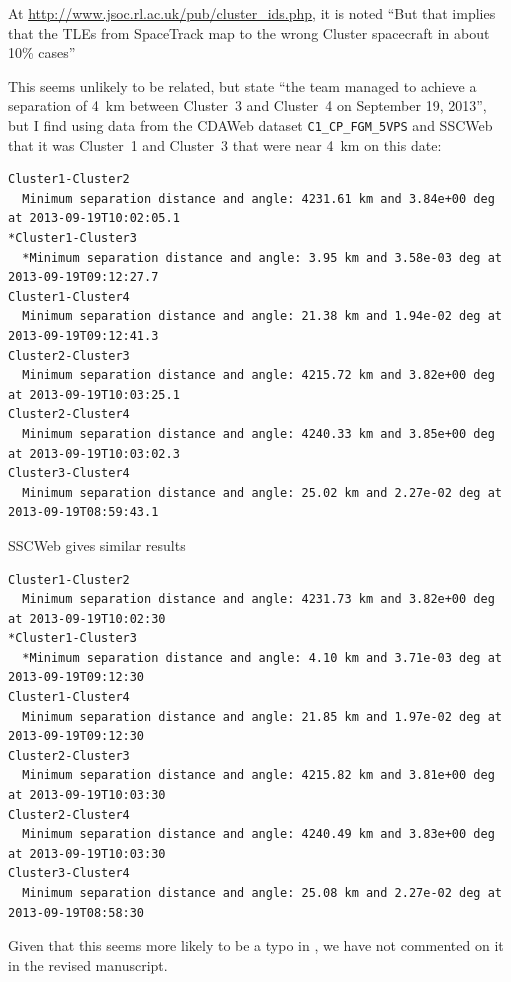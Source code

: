 \documentclass[11pt]{article}
\let\oldhref\href
\renewcommand{\href}[2]{\oldhref{#1}{\uline{#2}}}
\begin{document}
{\color{violet}
\begin{leftbar}
At \href{cluster\_ids.php}{http://www.jsoc.rl.ac.uk/pub/cluster\_ids.php}, it is noted ``But that implies that the TLEs from SpaceTrack map to the wrong Cluster spacecraft in about 10\% cases''

This seems unlikely to be related, but \citep{Escoubet2021} state ``the team managed to achieve a separation of 4~km between Cluster~3 and Cluster~4 on September 19, 2013'', but I find using data from the CDAWeb dataset \texttt{C1\_CP\_FGM\_5VPS} and SSCWeb that it was Cluster~1 and Cluster~3 that were near 4~km on this date:

\begin{small}
\begin{verbatim}
Cluster1-Cluster2
  Minimum separation distance and angle: 4231.61 km and 3.84e+00 deg at 2013-09-19T10:02:05.1
*Cluster1-Cluster3
  *Minimum separation distance and angle: 3.95 km and 3.58e-03 deg at 2013-09-19T09:12:27.7
Cluster1-Cluster4
  Minimum separation distance and angle: 21.38 km and 1.94e-02 deg at 2013-09-19T09:12:41.3
Cluster2-Cluster3
  Minimum separation distance and angle: 4215.72 km and 3.82e+00 deg at 2013-09-19T10:03:25.1
Cluster2-Cluster4
  Minimum separation distance and angle: 4240.33 km and 3.85e+00 deg at 2013-09-19T10:03:02.3
Cluster3-Cluster4
  Minimum separation distance and angle: 25.02 km and 2.27e-02 deg at 2013-09-19T08:59:43.1
\end{verbatim}
\end{small}

SSCWeb gives similar results

\begin{small}
\begin{verbatim}
Cluster1-Cluster2
  Minimum separation distance and angle: 4231.73 km and 3.82e+00 deg at 2013-09-19T10:02:30
*Cluster1-Cluster3
  *Minimum separation distance and angle: 4.10 km and 3.71e-03 deg at 2013-09-19T09:12:30
Cluster1-Cluster4
  Minimum separation distance and angle: 21.85 km and 1.97e-02 deg at 2013-09-19T09:12:30
Cluster2-Cluster3
  Minimum separation distance and angle: 4215.82 km and 3.81e+00 deg at 2013-09-19T10:03:30
Cluster2-Cluster4
  Minimum separation distance and angle: 4240.49 km and 3.83e+00 deg at 2013-09-19T10:03:30
Cluster3-Cluster4
  Minimum separation distance and angle: 25.08 km and 2.27e-02 deg at 2013-09-19T08:58:30    
\end{verbatim}
\end{small}

Given that this seems more likely to be a typo in \cite{Escoubet2021}, we have not commented on it in the revised manuscript.
\end{leftbar}
}
\fi
\end{document}
